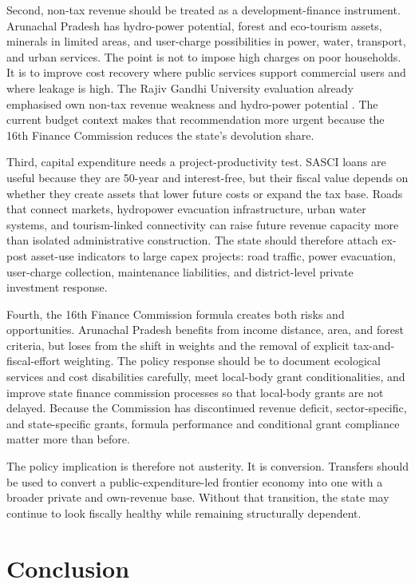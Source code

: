 \documentclass[11pt,a4paper]{article}
\begin{document}
Second, non-tax revenue should be treated as a development-finance instrument. Arunachal Pradesh has hydro-power potential, forest and eco-tourism assets, minerals in limited areas, and user-charge possibilities in power, water, transport, and urban services. The point is not to impose high charges on poor households. It is to improve cost recovery where public services support commercial users and where leakage is high. The Rajiv Gandhi University evaluation already emphasised own non-tax revenue weakness and hydro-power potential \citep{nayak_rgu_2019}. The current budget context makes that recommendation more urgent because the 16th Finance Commission reduces the state's devolution share.

Third, capital expenditure needs a project-productivity test. SASCI loans are useful because they are 50-year and interest-free, but their fiscal value depends on whether they create assets that lower future costs or expand the tax base. Roads that connect markets, hydropower evacuation infrastructure, urban water systems, and tourism-linked connectivity can raise future revenue capacity more than isolated administrative construction. The state should therefore attach ex-post asset-use indicators to large capex projects: road traffic, power evacuation, user-charge collection, maintenance liabilities, and district-level private investment response.

Fourth, the 16th Finance Commission formula creates both risks and opportunities. Arunachal Pradesh benefits from income distance, area, and forest criteria, but loses from the shift in weights and the removal of explicit tax-and-fiscal-effort weighting. The policy response should be to document ecological services and cost disabilities carefully, meet local-body grant conditionalities, and improve state finance commission processes so that local-body grants are not delayed. Because the Commission has discontinued revenue deficit, sector-specific, and state-specific grants, formula performance and conditional grant compliance matter more than before.

The policy implication is therefore not austerity. It is conversion. Transfers should be used to convert a public-expenditure-led frontier economy into one with a broader private and own-revenue base. Without that transition, the state may continue to look fiscally healthy while remaining structurally dependent.

\section{Conclusion}
\end{document}
